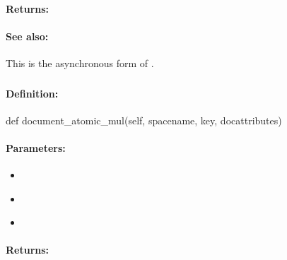 \paragraph{Returns:}


\paragraph{See also:}  This is the asynchronous form of .

\pagebreak
\subsubsection{}
\label{api:python:document_atomic_mul}


\paragraph{Definition:}
\begin{pythoncode}
def document_atomic_mul(self, spacename, key, docattributes)
\end{pythoncode}

\paragraph{Parameters:}
\begin{itemize}[noitemsep]
\item {}\\

\item {}\\

\item {}\\

\end{itemize}

\paragraph{Returns:}


\pagebreak
\subsubsection{}
\label{api:python:async_document_atomic_mul}


